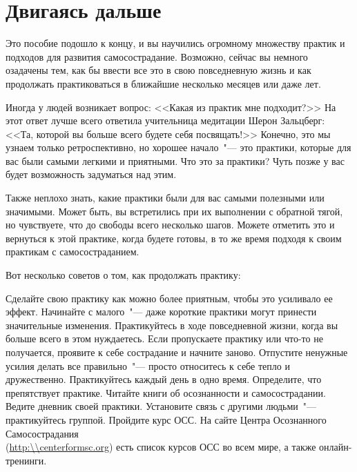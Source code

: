 
\chapter{Двигаясь дальше} \label{Taking_It_Forward}

Это пособие подошло к концу, и вы научились огромному множеству практик и подходов для развития самосострадание. Возможно, сейчас вы немного озадачены тем, как бы ввести все это в свою повседневную жизнь и как продолжать практиковаться в ближайшие несколько месяцев или даже лет. 

Иногда у людей возникает вопрос: <<Какая из практик мне подходит?>> На этот ответ лучше всего ответила учительница медитации  Шерон Зальцберг: <<Та, которой вы больше всего будете себя посвящать!>> Конечно, это мы узнаем только ретроспективно, но хорошее начало~"--- это практики, которые для вас были самыми легкими и приятными. Что это за практики? Чуть позже у вас будет возможность задуматься над этим.

Также неплохо знать, какие практики были для вас самыми полезными или значимыми. Может быть, вы встретились при их выполнении с обратной тягой, но чувствуете, что до свободы всего несколько шагов. Можете отметить это и вернуться к этой практике, когда будете готовы, в то же время подходя к своим практикам с самосостраданием.  

\vspace{2ex}

Вот несколько советов о том, как продолжать практику: 

\begin{itemize}
	\itemdiamondsuit Сделайте свою практику как можно более приятным, чтобы это усиливало ее эффект.
	\itemdiamondsuit Начинайте с малого~"--- даже короткие практики могут принести значительные изменения.
	\itemdiamondsuit Практикуйтесь в ходе повседневной жизни, когда вы больше всего в этом нуждаетесь.
	\itemdiamondsuit Если пропускаете практику или что-то не получается, проявите к себе сострадание и начните заново.
	\itemdiamondsuit Отпустите ненужные усилия делать все правильно~"--- просто относитесь к себе тепло и дружественно.
	\itemdiamondsuit Практикуйтесь каждый день в одно время.
	\itemdiamondsuit Определите, что препятствует практике.
	\itemdiamondsuit Читайте книги об осознанности и самосострадании.
	\itemdiamondsuit Ведите дневник своей практики.
	\itemdiamondsuit Установите связь с другими людьми~"--- практикуйтесь группой.
	\itemdiamondsuit Пройдите курс ОСС. На сайте Центра Осознанного Самосострадания\\ (\url{http:\\centerformsc.org}) есть список курсов ОСС во всем мире, а также онлайн-тренинги.
\end{itemize}

